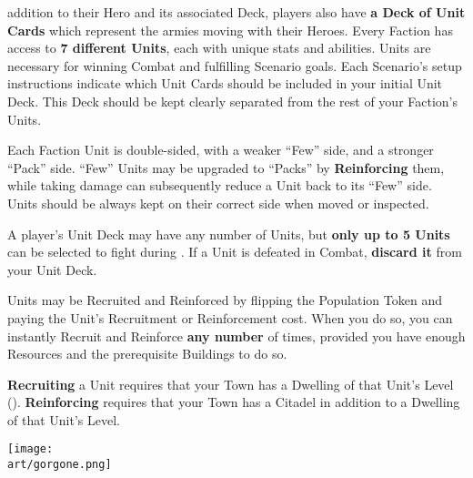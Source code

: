
\begin{multicols*}{2}

 addition to their Hero and its associated Deck, players also have \textbf{a Deck of Unit Cards} which represent the armies moving with their Heroes.
Every Faction has access to \textbf{7 different Units}, each with unique stats and abilities.
Units are necessary for winning Combat and fulfilling Scenario goals.
Each Scenario's setup instructions indicate which Unit Cards should be included in your initial Unit Deck.
This Deck should be kept clearly separated from the rest of your Faction's Units.\par
Each Faction Unit is double-sided, with a weaker ``Few'' side, and a stronger ``Pack'' side.
``Few'' Units may be upgraded to ``Packs'' by \textbf{Reinforcing} them, while taking damage can subsequently reduce a Unit back to its ``Few'' side.
Units should be always kept on their correct side when moved or inspected.\par
A player's Unit Deck may have any number of Units, but \textbf{only up to 5 Units} can be selected to fight during .
If a Unit is defeated in Combat, \textbf{discard it} from your Unit Deck.\par
Units may be Recruited and Reinforced by flipping the Population Token and paying the Unit's Recruitment  or Reinforcement  cost.
When you do so, you can instantly Recruit and Reinforce \textbf{any number} of times, provided you have enough Resources and the prerequisite Buildings to do so.\par
\textbf{Recruiting} a Unit requires that your Town has a Dwelling of that Unit's Level ().
\textbf{Reinforcing} requires that your Town has a Citadel in addition to a Dwelling of that Unit's Level.\par


\vspace*{\fill}
\iftoggle{printable}{}{\hspace{1em}}
{\texttt{[image: \\art/gorgone.png]}}

\clearpage

\end{multicols*}


